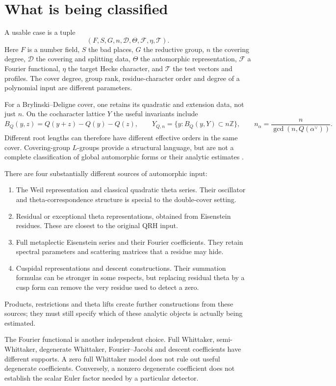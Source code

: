 \documentclass[11pt]{article}
\newcommand{\ZZ}{\mathbb Z}
\begin{document}
\section{What is being classified}

A usable case is a tuple
\[
 (F,S,G,n,\mathcal D,\Theta,\mathcal F,\eta,\mathcal T).
\]
Here $F$ is a number field, $S$ the bad places, $G$ the reductive group,
$n$ the covering degree, $\mathcal D$ the covering and splitting data,
$\Theta$ the automorphic representation, $\mathcal F$ a Fourier functional,
$\eta$ the target Hecke character, and $\mathcal T$ the test vectors and
profiles. The cover degree, group rank, residue-character order and
degree of a polynomial input are different parameters.

For a Brylinski--Deligne cover, one retains its quadratic and extension
data, not just $n$. On the cocharacter lattice $Y$ the useful invariants
include
\[
 B_Q(y,z)=Q(y+z)-Q(y)-Q(z),\qquad
 Y_{Q,n}=\{y:B_Q(y,Y)\subset n\ZZ\},\qquad
 n_\alpha=\frac n{\gcd(n,Q(\alpha^\vee))}.
\]
Different root lengths can therefore have different effective orders in
the same cover. Covering-group $L$-groups provide a structural language,
but are not a complete classification of global automorphic forms
or their analytic estimates \cite{Weissman}.

There are four substantially different sources of automorphic input:
\begin{enumerate}
\item The Weil representation and classical quadratic theta series.
Their oscillator and theta-correspondence structure is special to the
double-cover setting.
\item Residual or exceptional theta representations, obtained from
Eisenstein residues. These are closest to the original QRH input.
\item Full metaplectic Eisenstein series and their Fourier coefficients.
They retain spectral parameters and scattering matrices that a residue
may hide.
\item Cuspidal representations and descent constructions. Their summation
formulas can be stronger in some respects, but replacing residual theta by
a cusp form can remove the very residue used to detect a zero.
\end{enumerate}
Products, restrictions and theta lifts create further constructions from
these sources; they must still specify which of these analytic objects
is actually being estimated.

The Fourier functional is another independent choice. Full Whittaker,
semi-Whittaker, degenerate Whittaker, Fourier--Jacobi and descent
coefficients have different supports. A zero full Whittaker model does
not rule out useful degenerate coefficients. Conversely, a nonzero
degenerate coefficient does not establish the scalar Euler factor
needed by a particular detector.
\end{document}
